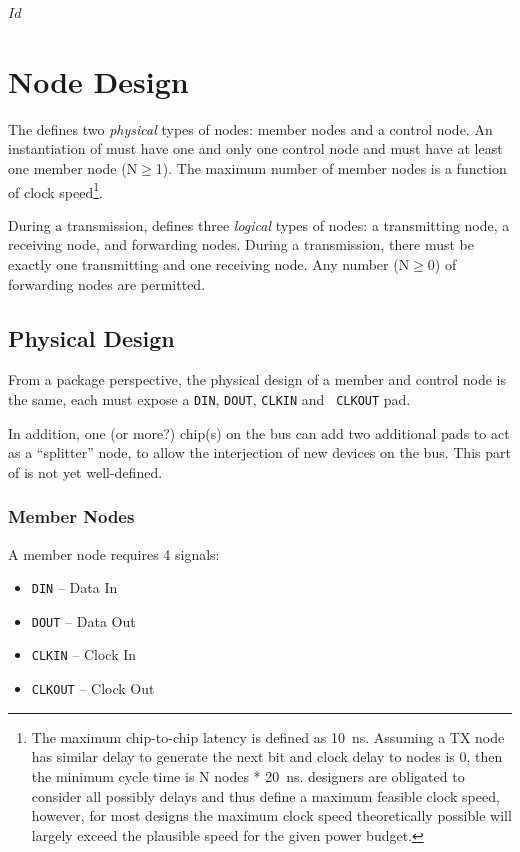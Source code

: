 \svnInfo $Id$

\section{Node Design}
\label{sec:node}
The \bus defines two {\em physical} types of nodes: member nodes and a control
node. An instantiation of \bus must have one and only one control node and
must have at least one member node (N$\geq$1). The maximum number of member
nodes is a function of clock speed\footnote{
  The maximum chip-to-chip latency is defined as 10~ns. Assuming a TX node has
similar delay to generate the next bit and clock delay to nodes is 0, then the
minimum cycle time is N nodes * 20~ns. \bus designers are obligated to
consider all possibly delays and thus define a maximum feasible clock speed,
however, for most designs the maximum clock speed theoretically possible will
largely exceed the plausible speed for the given power budget.}.

During a transmission, \bus defines three {\em logical} types of nodes:
a transmitting node, a receiving node, and forwarding nodes. During a
transmission, there must be exactly one transmitting and one receiving node.
Any number (N$\geq$0) of forwarding nodes are permitted.

\subsection{Physical Design}
\label{sec:physical}

From a package perspective, the physical design of a member and control node
is the same, each must expose a {\tt DIN}, {\tt DOUT}, {\tt CLKIN} and {\tt
CLKOUT} pad.

In addition, one (or more?) chip(s) on the bus can add two additional pads to
act as a ``splitter'' node, to allow the interjection of new devices on the
bus. This part of \bus is not yet well-defined.

\subsubsection{Member Nodes}
\label{sec:physical-member}
A member node requires 4 signals:

\begin{itemize}
  \item {\tt DIN} -- Data In
  \item {\tt DOUT} -- Data Out
  \item {\tt CLKIN} -- Clock In
  \item {\tt CLKOUT} -- Clock Out
\end{itemize}

